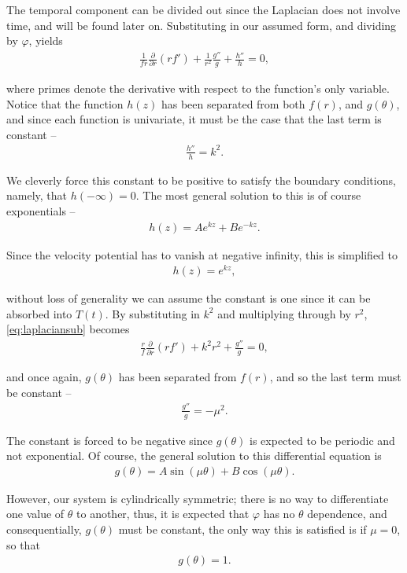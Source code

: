 The temporal component can be divided out since the Laplacian does not involve time, and will be found later on. Substituting in our assumed form, and dividing by $\varphi$, yields
\begin{align}
\label{eq:laplaciansub}
\frac{1}{fr}\frac{\partial}{\partial r}(rf') + \frac{1}{r^2}\frac{g''}{g} + \frac{h''}{h} = 0,
\end{align}

where primes denote the derivative with respect to the function's only variable. Notice that the function $h(z)$ has been separated from both $f(r)$, and $g(\theta)$, and since each function is univariate, it must be the case that the last term is constant --
\begin{align*}
\frac{h''}{h} = k^2.
\end{align*}

We cleverly force this constant to be positive to satisfy the boundary conditions, namely, that $h(-\infty) = 0$. The most general solution to this is of course exponentials --
\begin{align*}
h(z) = Ae^{kz} + Be^{-kz}.
\end{align*}

Since the velocity potential has to vanish at negative infinity, this is simplified to
\begin{align}
\label{eq:h}
h(z) = e^{kz},
\end{align}

without loss of generality we can assume the constant is one since it can be absorbed into $T(t)$. By substituting in $k^2$ and multiplying through by $r^2$, \eqref{eq:laplaciansub} becomes
\begin{align}
\label{eq:laplacenoh}
\frac{r}{f}\frac{\partial}{\partial r} \left( rf' \right) + k^2r^2 + \frac{g''}{g} = 0,
\end{align}

and once again, $g(\theta)$ has been separated from $f(r)$, and so the last term must be constant --
\begin{align*}
\frac{g''}{g} = -\mu^2.
\end{align*}

The constant is forced to be negative since $g(\theta)$ is expected to be periodic and not exponential. Of course, the general solution to this differential equation is 
\begin{align*}
g(\theta) = A \sin(\mu \theta) + B \cos(\mu \theta).
\end{align*}

However, our system is cylindrically symmetric; there is no way to differentiate one value of $\theta$ to another, thus, it is expected that $\varphi$ has no $\theta$ dependence, and consequentially, $g(\theta)$ must be constant, the only way this is satisfied is if $\mu = 0$, so that
\begin{align}
\label{eq:g}
g(\theta) = 1.
\end{align}

